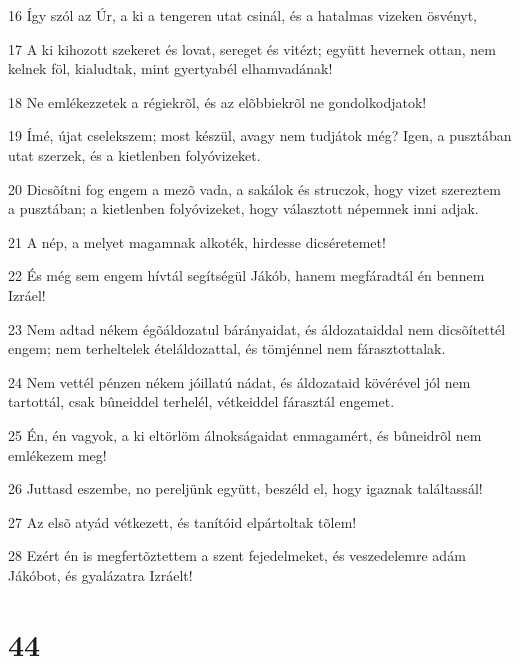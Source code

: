 \par 16 Így szól az Úr, a ki a tengeren utat csinál, és a hatalmas vizeken ösvényt,
\par 17 A ki kihozott szekeret és lovat, sereget és vitézt; együtt hevernek ottan, nem kelnek föl, kialudtak, mint gyertyabél elhamvadának!
\par 18 Ne emlékezzetek a régiekrõl, és az elõbbiekrõl ne gondolkodjatok!
\par 19 Ímé, újat cselekszem; most készül, avagy nem tudjátok még? Igen, a pusztában utat szerzek, és a kietlenben folyóvizeket.
\par 20 Dicsõítni fog engem a mezõ vada, a sakálok és struczok, hogy vizet szereztem a pusztában; a kietlenben folyóvizeket, hogy választott népemnek inni adjak.
\par 21 A nép, a melyet magamnak alkoték, hirdesse dicséretemet!
\par 22 És még sem engem hívtál segítségül Jákób, hanem megfáradtál én bennem Izráel!
\par 23 Nem adtad nékem égõáldozatul bárányaidat, és áldozataiddal nem dicsõítettél engem; nem terheltelek ételáldozattal, és tömjénnel nem fárasztottalak.
\par 24 Nem vettél pénzen nékem jóillatú nádat, és áldozataid kövérével jól nem tartottál, csak bûneiddel terhelél, vétkeiddel fárasztál engemet.
\par 25 Én, én vagyok, a ki eltörlöm álnokságaidat enmagamért, és bûneidrõl nem emlékezem meg!
\par 26 Juttasd eszembe, no pereljünk együtt, beszéld el, hogy igaznak találtassál!
\par 27 Az elsõ atyád vétkezett, és tanítóid elpártoltak tõlem!
\par 28 Ezért én is megfertõztettem a szent fejedelmeket, és veszedelemre adám Jákóbot, és gyalázatra Izráelt!

\chapter{44}


